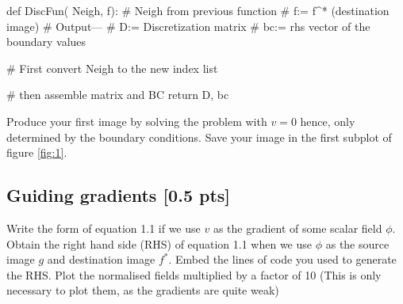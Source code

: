 \documentclass[paper=a4, fontsize=12pt]{scrartcl} %
\numberwithin{equation}{section}       %
\numberwithin{figure}{section}         %
\numberwithin{table}{section}          %
\begin{document}
\begin{python}
def  DiscFun( Neigh, f):
# Neigh from previous function
# f:= f^* (destination image)
# Output---
# D:= Discretization matrix
# bc:= rhs vector of the boundary values

# First convert Neigh to the new index list

# then assemble matrix and BC        
    return D, bc
 
\end{python}



Produce your first image by solving the problem with $v=0$  hence, only determined by the boundary conditions. Save your image in the first subplot of figure \ref{fig:1}.

\subsection{ Guiding gradients [0.5 pts]}
 Write the form of equation 1.1 if we use $v$ as the gradient of some scalar field $ \phi$. Obtain the right hand side (RHS) of equation 1.1 when we use  $\phi$ as the source image $g$  and destination image $f^*$.
 Embed the lines of code you used to generate the RHS. 
 Plot the normalised fields multiplied by a factor of 10 (This is only necessary to plot them, as the gradients are quite weak)
\end{document}

